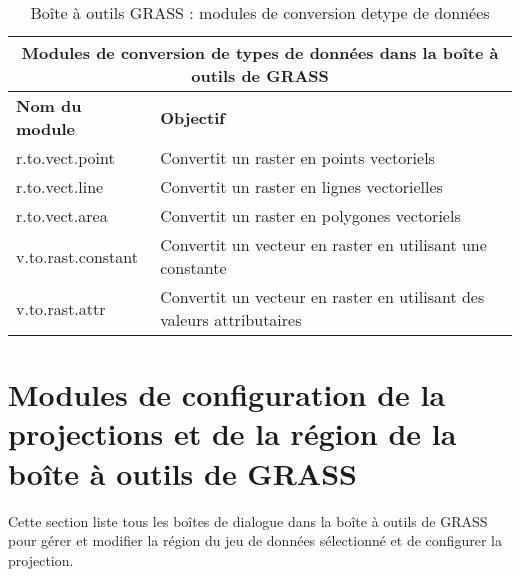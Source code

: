 \begin{table}[H]
\centering
 \begin{tabular}{|p{4cm}|p{10cm}|}
  \hline \multicolumn{2}{|c|}{\textbf{Modules de conversion de types de données dans la boîte à outils de GRASS}} \\
    \hline \textbf{Nom du module} & \textbf{Objectif} \\
  \hline r.to.vect.point & Convertit un raster en points vectoriels \\
  \hline r.to.vect.line & Convertit un raster en lignes vectorielles \\
  \hline r.to.vect.area & Convertit un raster en polygones vectoriels \\
  \hline v.to.rast.constant & Convertit un vecteur en raster en utilisant une constante \\
  \hline v.to.rast.attr & Convertit un vecteur en raster en utilisant des valeurs attributaires\\
\hline
\end{tabular}
\caption{Boîte à outils GRASS : modules de conversion detype de données}
\end{table}

\section{Modules de configuration de la projections et de la région de la boîte à outils de GRASS }

Cette section liste tous les boîtes de dialogue dans la boîte à outils de GRASS pour gérer et modifier la région du jeu de données sélectionné et de configurer la projection.

